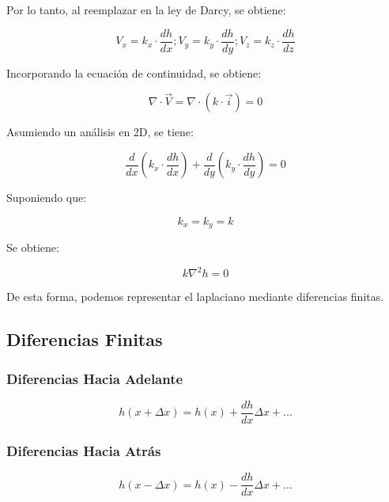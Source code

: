 Por lo tanto, al reemplazar en la ley de Darcy, se obtiene:

\begin{equation}
    V_x = k_x\cdot \frac{dh}{dx}; V_y = k_y\cdot \frac{dh}{dy}; V_z = k_z\cdot \frac{dh}{dz}
\end{equation}

Incorporando la ecuación de continuidad, se obtiene:

\begin{equation}
    \nabla \cdot \vec{V} = \nabla \cdot (k \cdot \vec{i}) = 0
\end{equation}

Asumiendo un análisis en 2D, se tiene:

\begin{equation}
    \frac{d}{dx}(k_x \cdot \frac{dh}{dx}) + \frac{d}{dy}(k_y \cdot \frac{dh}{dy}) = 0
\end{equation}

Suponiendo que:

\begin{equation}
    k_x = k_y = k
\end{equation}

Se obtiene:

\begin{equation}
    k \nabla^2 h = 0
\end{equation}

De esta forma, podemos representar el laplaciano mediante diferencias finitas.

\subsection{Diferencias Finitas}

\subsubsection{Diferencias Hacia Adelante}

\begin{equation}
    h(x + \Delta x) = h(x) + \frac{dh}{dx} \Delta x + ...
\end{equation}

\subsubsection{Diferencias Hacia Atrás}

\begin{equation}
    h(x - \Delta x) = h(x) - \frac{dh}{dx} \Delta x + ...
\end{equation}

